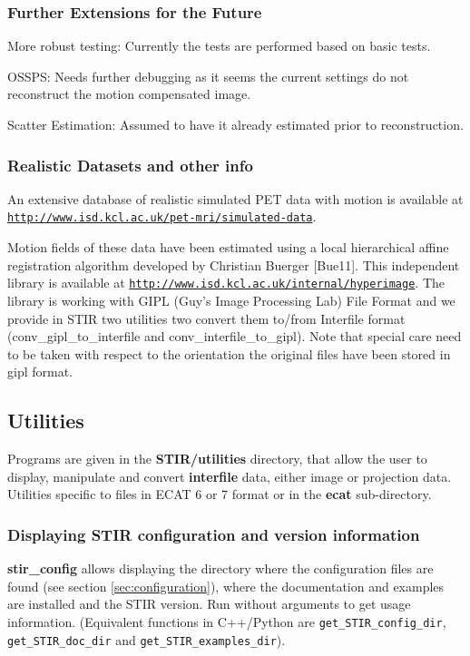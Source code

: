 \documentclass{article}
\def\url#1#2{\mbox{\href{#1}{\tt #2}}}
\begin{document}
\subsubsection{Further Extensions for the Future}
More robust testing: Currently the tests are performed based on basic tests.

OSSPS: Needs further debugging as it seems the current settings do not reconstruct the
motion compensated image. 

Scatter Estimation: Assumed to have it already estimated prior to reconstruction. 

\subsubsection{Realistic Datasets and other info}
An extensive
database of realistic simulated PET data with motion is available at\\
\url{http://www.isd.kcl.ac.uk/pet-mri/simulated-data/}{http://www.isd.kcl.ac.uk/pet-mri/simulated-data}. 

Motion fields of these data have been estimated using a local hierarchical affine
registration algorithm developed by Christian Buerger [Bue11]. This independent
library is available at
\url{http://www.isd.kcl.ac.uk/internal/hyperimage}{http://www.isd.kcl.ac.uk/internal/hyperimage}. 
The library is working with GIPL (Guy's Image Processing Lab) File Format and we provide in STIR two utilities two convert
them to/from Interfile format (conv\_gipl\_to\_interfile and
conv\_interfile\_to\_gipl). Note that special care need to be taken with respect
to the orientation the original files have been stored in gipl format. 


\subsection{
Utilities} \label{sec:Utilities}

Programs are given in the \textbf{STIR/utilities} directory, that 
allow the user to display, manipulate and convert \textbf{interfile} 
data, either image or projection data.
Utilities specific to files in ECAT 6 or 7 format or in the \textbf{ecat}
sub-directory.

\subsubsection{Displaying STIR configuration and version information}
\label{sec:stirconfig}
\textbf{stir\_config} allows displaying the directory where the configuration files
are found (see section \ref{sec:configuration}), where the documentation and examples are installed
and the STIR version. Run without arguments to get usage information.
(Equivalent functions in C++/Python are \texttt{get\_STIR\_config\_dir},
\texttt{get\_STIR\_doc\_dir} and \texttt{get\_STIR\_examples\_dir}).
\end{document}
